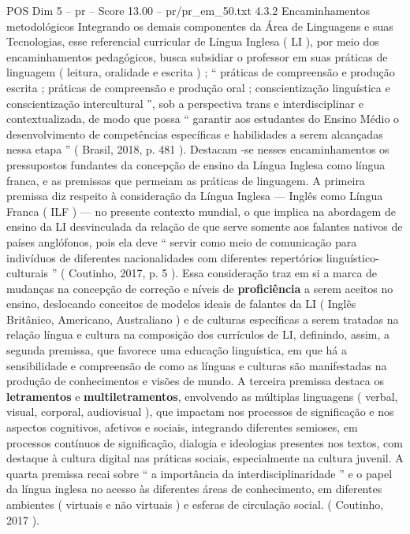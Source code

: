 \begin{textsample}{POS Dim 5 – pr – Score 13.00 – pr/pr\_em\_50.txt}  \label{ex:f5_pos_054}
4.3.2 Encaminhamentos metodológicos Integrando os demais componentes da Área de Linguagens e suas Tecnologias, esse referencial curricular de Língua Inglesa ( LI ), por meio dos encaminhamentos pedagógicos, busca subsidiar o professor em suas práticas de linguagem ( leitura, oralidade e escrita ) ; “ práticas de compreensão e produção escrita ; práticas de compreensão e produção oral ; conscientização linguística e conscientização intercultural ”, sob a perspectiva trans e interdisciplinar e contextualizada, de modo que possa “ garantir aos estudantes do Ensino Médio o desenvolvimento de competências específicas e habilidades a serem alcançadas nessa etapa ” ( Brasil, 2018, p. 481 ).
Destacam -se nesses encaminhamentos os pressupostos fundantes da concepção de ensino da Língua Inglesa como língua franca, e as premissas que permeiam as práticas de linguagem.
A primeira premissa diz respeito à consideração da Língua Inglesa — Inglês como Língua Franca ( ILF ) — no presente contexto mundial, o que implica na abordagem de ensino da LI desvinculada da relação de que serve somente aos falantes nativos de países anglófonos, pois ela deve “ servir como meio de comunicação para indivíduos de diferentes nacionalidades com diferentes repertórios linguístico-culturais ” ( Coutinho, 2017, p. 5 ).
Essa consideração traz em si a marca de mudanças na concepção de correção e níveis de \textbf{proficiência} a serem aceitos no ensino, deslocando conceitos de modelos ideais de falantes da LI ( Inglês Britânico, Americano, Australiano ) e de culturas específicas a serem tratadas na relação língua e cultura na composição dos currículos de LI, definindo, assim, a segunda premissa, que favorece uma educação linguística, em que há a sensibilidade e compreensão de como as línguas e culturas são manifestadas na produção de conhecimentos e visões de mundo.
A terceira premissa destaca os \textbf{letramentos} e \textbf{multiletramentos}, envolvendo as múltiplas linguagens ( verbal, visual, corporal, audiovisual ), que impactam nos processos de significação e nos aspectos cognitivos, afetivos e sociais, integrando diferentes semioses, em processos contínuos de significação, dialogia e ideologias presentes nos textos, com destaque à cultura digital nas práticas sociais, especialmente na cultura juvenil.
A quarta premissa recai sobre “ a importância da interdisciplinaridade ” e o papel da língua inglesa no acesso às diferentes áreas de conhecimento, em diferentes ambientes ( virtuais e não virtuais ) e esferas de circulação social. ( Coutinho, 2017 ).

\end{textsample}
